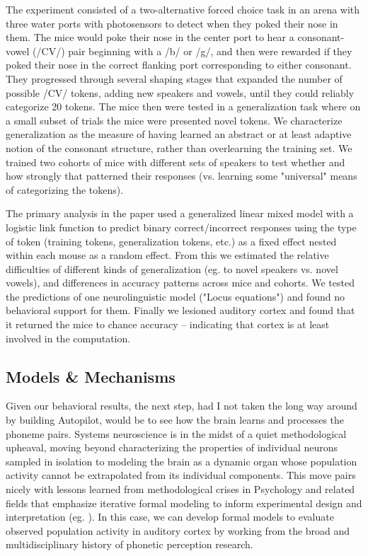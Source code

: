 \begin{done}
The experiment consisted of a two-alternative forced choice task in an arena with three water ports with photosensors to detect when they poked their nose in them. The mice would poke their nose in the center port to hear a consonant-vowel (/CV/) pair beginning with a /b/ or /g/, and then were rewarded if they poked their nose in the correct flanking port corresponding to either consonant. They progressed through several shaping stages that expanded the number of possible /CV/ tokens, adding new speakers and vowels, until they could reliably categorize 20 tokens. The mice then were tested in a generalization task where on a small subset of trials the mice were presented novel tokens. We characterize generalization as the measure of having learned an abstract or at least adaptive notion of the consonant structure, rather than overlearning the training set. We trained two cohorts of mice with different sets of speakers to test whether and how strongly that patterned their responses (vs. learning some "universal" means of categorizing the tokens).

The primary analysis in the paper used a generalized linear mixed model with a logistic link function to predict binary correct/incorrect responses using the type of token (training tokens, generalization tokens, etc.) as a fixed effect nested within each mouse as a random effect. From this we estimated the relative difficulties of different kinds of generalization (eg. to novel speakers vs. novel vowels), and differences in accuracy patterns across mice and cohorts. We tested the predictions of one neurolinguistic model ("Locus equations") and found no behavioral support for them. Finally we lesioned auditory cortex and found that it returned the mice to chance accuracy -- indicating that cortex is at least involved in the computation.
\end{done}

\subsection{Models \& Mechanisms}

Given our behavioral results, the next step, had I not taken the long way around by building Autopilot, would be to see how the brain learns and processes the phoneme pairs. Systems neuroscience is in the midst of a quiet methodological upheaval, moving beyond characterizing the properties of individual neurons sampled in isolation to modeling the brain as a dynamic organ whose population activity cannot be extrapolated from its individual components. This move pairs nicely with lessons learned from methodological crises in Psychology and related fields that emphasize iterative formal modeling to inform experimental design and interpretation (eg. \cite{vanrooijTheoryTestHow2021}). In this case, we can develop formal models to evaluate observed population activity in auditory cortex by working from the broad and multidisciplinary history of phonetic perception research.

